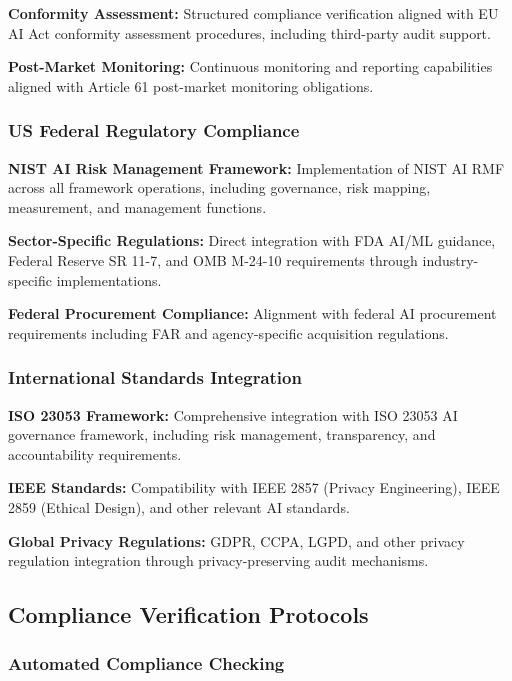 \documentclass[12pt,a4paper]{article}
\begin{document}
\textbf{Conformity Assessment:} Structured compliance verification aligned with EU AI Act conformity assessment procedures, including third-party audit support.

\textbf{Post-Market Monitoring:} Continuous monitoring and reporting capabilities aligned with Article 61 post-market monitoring obligations.

\subsubsection{US Federal Regulatory Compliance}

\textbf{NIST AI Risk Management Framework:} Implementation of NIST AI RMF across all framework operations, including governance, risk mapping, measurement, and management functions.

\textbf{Sector-Specific Regulations:} Direct integration with FDA AI/ML guidance, Federal Reserve SR 11-7, and OMB M-24-10 requirements through industry-specific implementations.

\textbf{Federal Procurement Compliance:} Alignment with federal AI procurement requirements including FAR and agency-specific acquisition regulations.

\subsubsection{International Standards Integration}

\textbf{ISO 23053 Framework:} Comprehensive integration with ISO 23053 AI governance framework, including risk management, transparency, and accountability requirements.

\textbf{IEEE Standards:} Compatibility with IEEE 2857 (Privacy Engineering), IEEE 2859 (Ethical Design), and other relevant AI standards.

\textbf{Global Privacy Regulations:} GDPR, CCPA, LGPD, and other privacy regulation integration through privacy-preserving audit mechanisms.

\subsection{Compliance Verification Protocols}

\subsubsection{Automated Compliance Checking}
\end{document}
